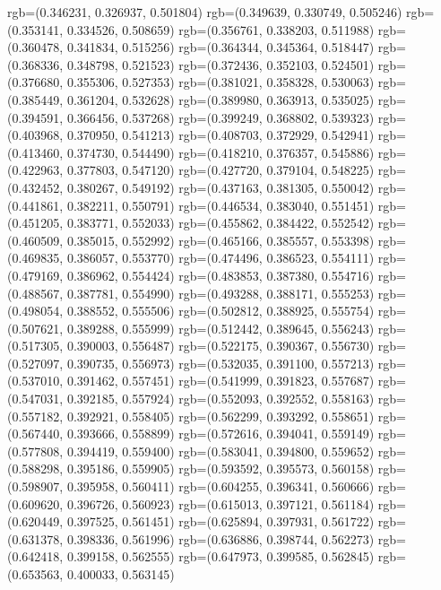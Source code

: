 {{{					rgb=(0.346231, 0.326937, 0.501804)
					rgb=(0.349639, 0.330749, 0.505246)
					rgb=(0.353141, 0.334526, 0.508659)
					rgb=(0.356761, 0.338203, 0.511988)
					rgb=(0.360478, 0.341834, 0.515256)
					rgb=(0.364344, 0.345364, 0.518447)
					rgb=(0.368336, 0.348798, 0.521523)
					rgb=(0.372436, 0.352103, 0.524501)
					rgb=(0.376680, 0.355306, 0.527353)
					rgb=(0.381021, 0.358328, 0.530063)
					rgb=(0.385449, 0.361204, 0.532628)
					rgb=(0.389980, 0.363913, 0.535025)
					rgb=(0.394591, 0.366456, 0.537268)
					rgb=(0.399249, 0.368802, 0.539323)
					rgb=(0.403968, 0.370950, 0.541213)
					rgb=(0.408703, 0.372929, 0.542941)
					rgb=(0.413460, 0.374730, 0.544490)
					rgb=(0.418210, 0.376357, 0.545886)
					rgb=(0.422963, 0.377803, 0.547120)
					rgb=(0.427720, 0.379104, 0.548225)
					rgb=(0.432452, 0.380267, 0.549192)
					rgb=(0.437163, 0.381305, 0.550042)
					rgb=(0.441861, 0.382211, 0.550791)
					rgb=(0.446534, 0.383040, 0.551451)
					rgb=(0.451205, 0.383771, 0.552033)
					rgb=(0.455862, 0.384422, 0.552542)
					rgb=(0.460509, 0.385015, 0.552992)
					rgb=(0.465166, 0.385557, 0.553398)
					rgb=(0.469835, 0.386057, 0.553770)
					rgb=(0.474496, 0.386523, 0.554111)
					rgb=(0.479169, 0.386962, 0.554424)
					rgb=(0.483853, 0.387380, 0.554716)
					rgb=(0.488567, 0.387781, 0.554990)
					rgb=(0.493288, 0.388171, 0.555253)
					rgb=(0.498054, 0.388552, 0.555506)
					rgb=(0.502812, 0.388925, 0.555754)
					rgb=(0.507621, 0.389288, 0.555999)
					rgb=(0.512442, 0.389645, 0.556243)
					rgb=(0.517305, 0.390003, 0.556487)
					rgb=(0.522175, 0.390367, 0.556730)
					rgb=(0.527097, 0.390735, 0.556973)
					rgb=(0.532035, 0.391100, 0.557213)
					rgb=(0.537010, 0.391462, 0.557451)
					rgb=(0.541999, 0.391823, 0.557687)
					rgb=(0.547031, 0.392185, 0.557924)
					rgb=(0.552093, 0.392552, 0.558163)
					rgb=(0.557182, 0.392921, 0.558405)
					rgb=(0.562299, 0.393292, 0.558651)
					rgb=(0.567440, 0.393666, 0.558899)
					rgb=(0.572616, 0.394041, 0.559149)
					rgb=(0.577808, 0.394419, 0.559400)
					rgb=(0.583041, 0.394800, 0.559652)
					rgb=(0.588298, 0.395186, 0.559905)
					rgb=(0.593592, 0.395573, 0.560158)
					rgb=(0.598907, 0.395958, 0.560411)
					rgb=(0.604255, 0.396341, 0.560666)
					rgb=(0.609620, 0.396726, 0.560923)
					rgb=(0.615013, 0.397121, 0.561184)
					rgb=(0.620449, 0.397525, 0.561451)
					rgb=(0.625894, 0.397931, 0.561722)
					rgb=(0.631378, 0.398336, 0.561996)
					rgb=(0.636886, 0.398744, 0.562273)
					rgb=(0.642418, 0.399158, 0.562555)
					rgb=(0.647973, 0.399585, 0.562845)
					rgb=(0.653563, 0.400033, 0.563145)
}}}
